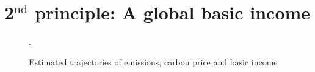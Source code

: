 \documentclass[a5paper,english,openany]{memoir}
\begin{document}
\section{2$^\text{nd}$ principle: A global basic income}\label{pcp:rdb}

\begin{figure}[bh!]
  \caption[Trajectories (emissions, price, basic income)]{Estimated trajectories of emissions, carbon price and basic income}.\label{fig:trajectory}
\end{figure} 
\end{document}
